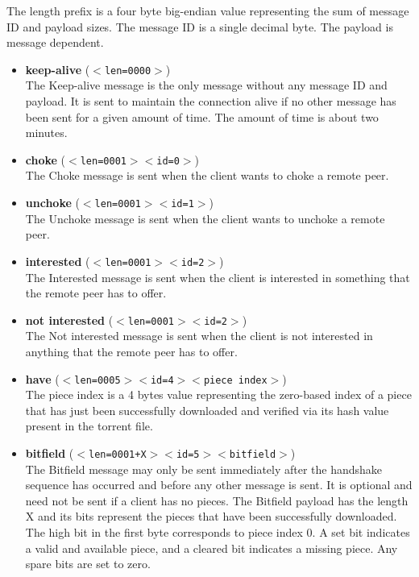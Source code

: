 The length prefix is a four byte big-endian value representing the sum of message ID and payload sizes. The message ID is a single decimal byte. The payload is message dependent.

\begin{itemize}

  \item \textbf{keep-alive} (\texttt{$<$len=0000$>$}) \\
    The Keep-alive message is the only message without any message ID and
    payload.  It is sent to maintain the connection alive if no other message
    has been sent for a given amount of time. The amount of time is about two
    minutes.

  \item \textbf{choke} (\texttt{$<$len=0001$>$$<$id=0$>$}) \\
    The Choke message is sent when the client wants to choke a remote peer.

  \item \textbf{unchoke} (\texttt{$<$len=0001$>$$<$id=1$>$}) \\
    The Unchoke message is sent when the client wants to unchoke a remote peer.

  \item \textbf{interested} (\texttt{$<$len=0001$>$$<$id=2$>$}) \\
    The Interested message is sent when the client is interested in something
    that the remote peer has to offer.

  \item \textbf{not interested} (\texttt{$<$len=0001$>$$<$id=2$>$}) \\
    The Not interested message is sent when the client is not interested in
    anything that the remote peer has to offer.

  \item \textbf{have} (\texttt{$<$len=0005$>$$<$id=4$>$$<$piece index$>$}) \\
    The piece index is a 4 bytes value representing the zero-based index of a
    piece that has just been successfully downloaded and verified via its hash
    value present in the torrent file.

  \item \textbf{bitfield} (\texttt{$<$len=0001+X$>$$<$id=5$>$$<$bitfield$>$}) \\
    The Bitfield message may only be sent immediately after the handshake
    sequence has occurred and before any other message is sent. It is optional
    and need not be sent if a client has no pieces. The Bitfield payload has
    the length X and its bits represent the pieces that have been successfully
    downloaded. The high bit in the first byte corresponds to piece index 0. A
    set bit indicates a valid and available piece, and a cleared bit indicates
    a missing piece. Any spare bits are set to zero.


\end{itemize}
